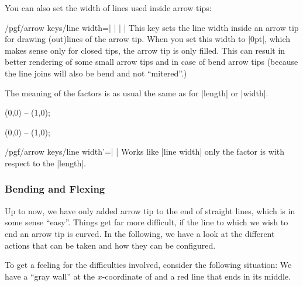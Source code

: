 You can also set the width of lines used inside arrow tips:

\begin{key}{/pgf/arrow keys/line width=| |%
        | |}
    This key sets the line width inside an arrow tip for drawing (out)lines of
    the arrow tip. When you set this width to |0pt|, which makes sense only for
    closed tips, the arrow tip is only filled. This can result in better
    rendering of some small arrow tips and in case of bend arrow tips (because
    the line joins will also be bend and not ``mitered''.)

    The meaning of the factors is as usual the same as for |length| or |width|.
\begin{codeexample}[width=2cm,preamble={\usetikzlibrary{arrows.meta}}]
\tikz \draw [arrows = {-Latex[line width=0.1pt, fill=white, length=10pt]}] (0,0) -- (1,0);
\end{codeexample}
\begin{codeexample}[width=2cm,preamble={\usetikzlibrary{arrows.meta}}]
\tikz \draw [arrows = {-Latex[line width=1pt, fill=white, length=10pt]}] (0,0) -- (1,0);
\end{codeexample}
\end{key}

\begin{key}{/pgf/arrow keys/line width'=| |}
    Works like |line width| only the factor is with respect to the |length|.
\end{key}


\subsubsection{Bending and Flexing}
\label{section-arrow-flex}

Up to now, we have only added arrow tip to the end of straight lines, which is
in some sense ``easy''. Things get far more difficult, if the line to which we
wish to end an arrow tip is curved. In the following, we have a look at the
different actions that can be taken and how they can be configured.

To get a feeling for the difficulties involved, consider the following
situation: We have a ``gray wall'' at the $x$-coordinate of and a red line that
ends in its middle.
%
\begin{codeexample}[preamble={\usetikzlibrary{patterns}}]
\def\wall{ \fill     [fill=black!50]  (1,-.5) rectangle (2,.5);
           \pattern  [pattern=bricks] (1,-.5) rectangle (2,.5);
           \draw     [line width=1pt]  (1cm+.5pt,-.5) -- ++(0,1); }
\end{codeexample}

